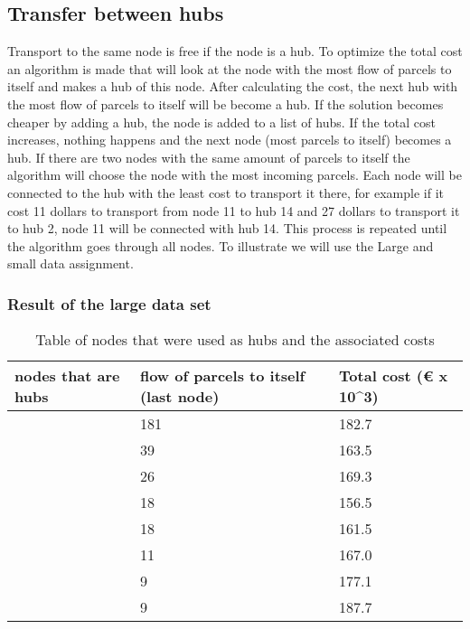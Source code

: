 \documentclass{article}
\begin{document}
    \subsection{Transfer between hubs} \label{sssec:num1}
        Transport to the same node is free if the node is a hub. To optimize the total cost an algorithm is made that will look at the node with the most flow of parcels to itself and makes a hub of this node. After calculating the cost, the next hub with the most flow of parcels to itself will be become a hub. If the solution becomes cheaper by adding a hub, the node is added to a list of hubs. If the total cost increases, nothing happens and the next node (most parcels to itself) becomes a hub. If there are two nodes with the same amount of parcels to itself the algorithm will choose the node with the most incoming parcels. Each node will be connected to the hub with the least cost to transport it there, for example if it cost 11 dollars to transport from node 11 to hub 14 and 27 dollars to transport it to hub 2, node 11 will be connected with hub 14. This process is repeated until the algorithm goes through all nodes. To illustrate we will use the Large and small data assignment.
\subsubsection{Result of the large data set}
        \begin{table}[h!]
            \begin{tabular}{|p{3cm}|p{3cm}|p{3cm}|}
                \hline
                nodes that are hubs & flow of parcels to itself (last node) & Total cost (€ x 10^3)\\
                \hline
                [14] &  181 & 182.7 \\
                \hline
                [14,2]   & 39 & 163.5 \\
                \hline
                [14,2,15] & 26 & 169.3 \\
                \hline
                [14,2,15,6]  & 18 & 156.5 \\
                \hline
                [14,2,15,6,13] & 18 & 161.5\\
                \hline
                [14,2,15,6,13,4] & 11 & 167.0   \\
                \hline
                [14,2,15,6,13,4,3] & 9 & 177.1   \\
                \hline
                [14,2,15,6,13,4,3,9] & 9 & 187.7    \\
                \hline
            \end{tabular}
        \caption{Table of nodes that were used as hubs and the associated costs}
        \end{table}
\end{document}

